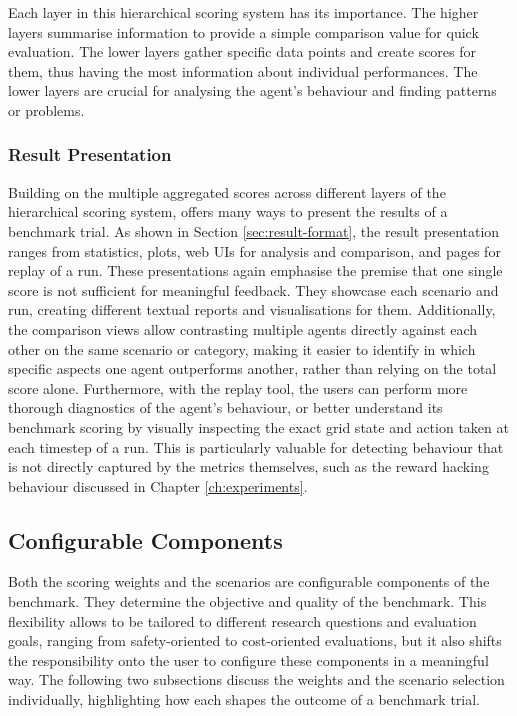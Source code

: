 Each layer in this hierarchical scoring system has its importance. The higher layers summarise information to provide a simple comparison value for quick evaluation. The lower layers gather specific data points and create scores for them, thus having the most information about individual performances. The lower layers are crucial for analysing the agent's behaviour and finding patterns or problems.

\subsubsection{Result Presentation}
Building on the multiple aggregated scores across different layers of the hierarchical scoring system, \benchmark offers many ways to present the results of a benchmark trial. As shown in Section \ref{sec:result-format}, the result presentation ranges from statistics, plots, web UIs for analysis and comparison, and pages for replay of a run. These presentations again emphasise the premise that one single score is not sufficient for meaningful feedback. They showcase each scenario and run, creating different textual reports and visualisations for them. Additionally, the comparison views allow contrasting multiple agents directly against each other on the same scenario or category, making it easier to identify in which specific aspects one agent outperforms another, rather than relying on the total score alone. Furthermore, with the replay tool, the users can perform more thorough diagnostics of the agent's behaviour, or better understand its benchmark scoring by visually inspecting the exact grid state and action taken at each timestep of a run. This is particularly valuable for detecting behaviour that is not directly captured by the metrics themselves, such as the reward hacking behaviour discussed in Chapter \ref{ch:experiments}.


\subsection{Configurable Components}
Both the scoring weights and the scenarios are configurable components of the benchmark. They determine the objective and quality of the benchmark. This flexibility allows \benchmark to be tailored to different research questions and evaluation goals, ranging from safety-oriented to cost-oriented evaluations, but it also shifts the responsibility onto the user to configure these components in a meaningful way. The following two subsections discuss the weights and the scenario selection individually, highlighting how each shapes the outcome of a benchmark trial.

